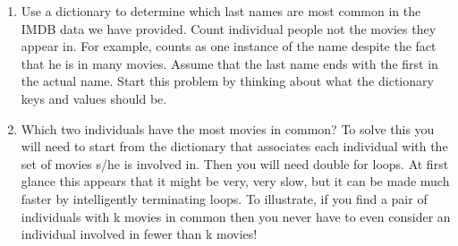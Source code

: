 \documentclass[letterpaper,10pt,english]{sphinxmanual}
\begin{document}
\begin{enumerate}
\item {} 
Use a dictionary to determine which last names are most common in the
IMDB data we have provided. Count individual people not the movies
they appear in. For example,  counts as one instance
of the name  despite the fact that he is in many movies.
Assume that the last name ends with the first  in the actual
name. Start this problem by thinking about what the dictionary keys
and values should be.

\item {} 
Which two individuals have the most movies in common? To solve this
you will need to start from the dictionary that associates each
individual with the set of movies s/he is involved in. Then you will
need double for loops. At first glance this appears that it might
be very, very slow, but it can be made much faster by intelligently
terminating loops. To illustrate, if you find a pair of
individuals with k movies in common then you never have to even
consider an individual involved in fewer than k movies!

\end{enumerate}
\end{document}
